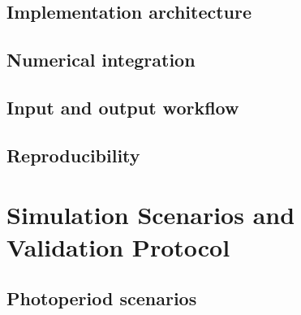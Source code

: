 \documentclass[a4paper,fleqn]{cas-dc}
\begin{document}

\subsection{Implementation architecture}

\subsection{Numerical integration}

\subsection{Input and output workflow}

\subsection{Reproducibility}

\section{Simulation Scenarios and Validation Protocol}
\label{sec:validation}


\subsection{Photoperiod scenarios}
\end{document}
